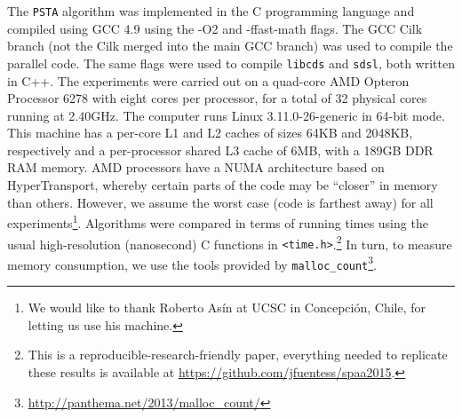 The {\tt PSTA} algorithm was implemented in the C programming language
and compiled using GCC 4.9 using the -O2 and -ffast-math flags. The
GCC Cilk branch (not the Cilk merged into the main GCC branch) was
used to compile the parallel code. The same flags were used to compile
{\tt libcds} and {\tt sdsl}, both written in C++. The experiments were
carried out on a quad-core AMD Opteron\texttrademark{} Processor 6278
with eight cores per processor, for a total of 32 physical cores
running at 2.40GHz. The computer runs Linux 3.11.0-26-generic in
64-bit mode. This machine has a per-core L1 and L2 caches of sizes
64KB and 2048KB, respectively and a per-processor shared L3 cache of
6MB, with a 189GB DDR RAM memory. AMD processors have a NUMA
architecture based on HyperTransport, whereby certain parts of the
code may be ``closer'' in memory than others. However, we assume the
worst case (code is farthest away) for all experiments\footnote{We
would like to thank Roberto As\'in at UCSC in Concepci\'on, Chile, for
letting us use his machine.}. Algorithms were compared in terms of
running times using the usual high-resolution (nanosecond) C functions
in {\tt <time.h>}.\footnote{This is a reproducible-research-friendly
paper, everything needed to replicate these results is available at
\url{https://github.com/jfuentess/spaa2015}.} In turn, to measure
memory consumption, we use the tools provided by
\verb+malloc_count+\footnote{\url{http://panthema.net/2013/malloc_count/}}.